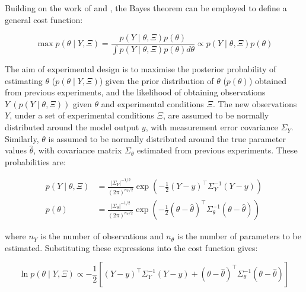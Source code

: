 \documentclass[a4paper,fleqn]{cas-dc}
\begin{document}
		Building on the work of \citet{Walter2010} and \citet{Himmelblau1970}, the Bayes theorem can be employed to define a general cost function:
		
		{\footnotesize
			\begin{equation}
				\max p\left(\theta \mid Y, \Xi \right) = \frac{p\left(Y \mid \theta, \Xi\right) p\left(\theta\right)}{\int p\left(Y \mid \theta, \Xi\right) p\left(\theta\right) d\theta} \propto p\left(Y \mid \theta, \Xi\right) p\left(\theta\right)
			\end{equation}
		}
		
		The aim of experimental design is to maximise the posterior probability of estimating $\theta$ ($p\left(\theta \mid Y, \Xi \right)$) given the prior distribution of $\theta$ ($p(\theta)$) obtained from previous experiments, and the likelihood of obtaining observations $Y~\left(p\left(Y \mid \theta, \Xi\right)\right)$ given $\theta$ and experimental conditions $\Xi$. The new observations $Y$, under a set of experimental conditions $\Xi$, are assumed to be normally distributed around the model output $y$, with measurement error covariance $\Sigma_Y$. Similarly, $\theta$ is assumed to be normally distributed around the true parameter values $\hat{\theta}$, with covariance matrix $\Sigma_\theta$ estimated from previous experiments. These probabilities are:
		
		{\footnotesize
			\begin{align} 
				p\left(Y \mid \theta, \Xi \right) &= \frac{|\Sigma_Y|^{-1/2}}{\left(2\pi\right)^{n_Y/2}} \exp\left( -\frac{1}{2} \left(Y - y \right)^\top \Sigma_Y^{-1} \left(Y - y\right) \right) \\
				p\left(\theta\right) &= \frac{|\Sigma_\theta|^{-1/2}}{\left(2\pi\right)^{n_\theta/2}} \exp\left( -\frac{1}{2} \left(\theta - \hat{\theta}\right)^\top \Sigma_\theta^{-1} \left(\theta - \hat{\theta}\right) \right)
			\end{align}
		}
		
		where $n_Y$ is the number of observations and $n_\theta$ is the number of parameters to be estimated. Substituting these expressions into the cost function gives:
		
		{\footnotesize 
			\begin{equation} 
				\ln p\left(\theta \mid Y, \Xi \right) \propto -\frac{1}{2} \left[ \left(Y - y\right)^\top \Sigma_Y^{-1} \left(Y - y\right) + \left(\theta - \hat{\theta}\right)^\top \Sigma_\theta^{-1} \left(\theta - \hat{\theta}\right) \right] 
		\end{equation} }
		
\end{document}
